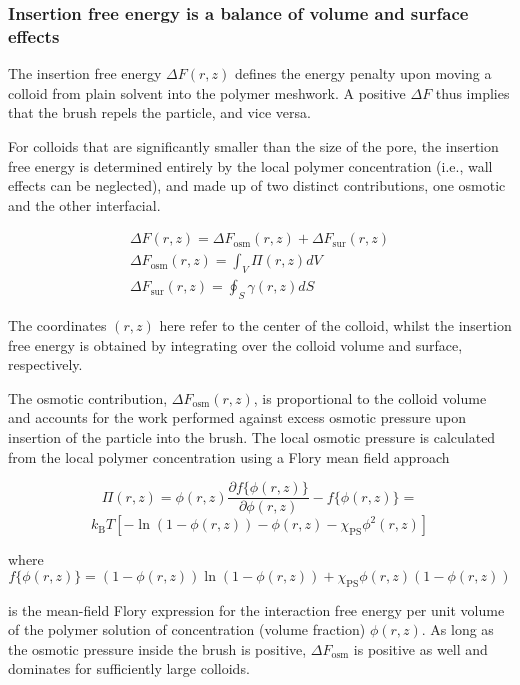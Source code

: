 \documentclass[12pt, a4paper]{article}
\begin{document}
\subsubsection{Insertion free energy is a balance of volume and surface effects}

The insertion free energy $\Delta F(r,z)$ defines the energy penalty upon moving a colloid from plain solvent into the polymer meshwork.
A positive $\Delta F$ thus implies that the brush repels the particle, and vice versa.

For colloids that are significantly smaller than the size of the pore, the insertion free energy is determined entirely by the local polymer concentration (i.e., wall effects can be neglected), 
and made up of two distinct contributions, one osmotic and the other interfacial.

\begin{eqnarray}
    \Delta F (r,z)= \Delta F_{\text{osm}}(r,z) + \Delta F_{\text{sur}}(r,z)
    \\
    \Delta F_{\text{osm}}(r,z) = \int_{V} \Pi(r,z) dV
    \\
    \Delta F_{\text{sur}}(r,z) = \oint_{S} \gamma (r,z) dS
    \label{eq:Delta_F}
\end{eqnarray}

\noindent The coordinates $(r,z)$ here refer to the center of the colloid, whilst the insertion free energy is obtained by integrating over the colloid volume and surface, respectively.

The osmotic contribution, $\Delta F_{\text{osm}}(r,z)$, is proportional to the colloid volume 
and accounts for the work performed against excess osmotic pressure upon insertion of the particle into the brush. 
The local osmotic pressure is calculated from the local polymer concentration using a Flory mean field approach 

$$
\Pi(r,z)=  \phi(r,z)\frac{\partial f\{\phi(r,z)\}}{\partial \phi(r,z)} - f\{\phi(r,z)\}= 
$$
\begin{equation}
	k_{\text{B}}T[-\ln(1-\phi(r,z)) - \phi(r,z) -\chi_{\text{PS}}\phi^2(r,z)]
\end{equation}

\noindent where
$$
f\{\phi(r,z)\}=(1-\phi(r,z))\ln(1-\phi(r,z)) +\chi_{\text{PS}}\phi(r,z)(1-\phi(r,z))
$$

\noindent is the mean-field Flory expression for the interaction free energy per unit volume of the polymer solution of concentration (volume fraction) $\phi(r,z)$.
As long as the osmotic pressure inside the brush is positive, $\Delta F_{\text{osm}}$ is positive as well and dominates for sufficiently large colloids. 
\end{document}
